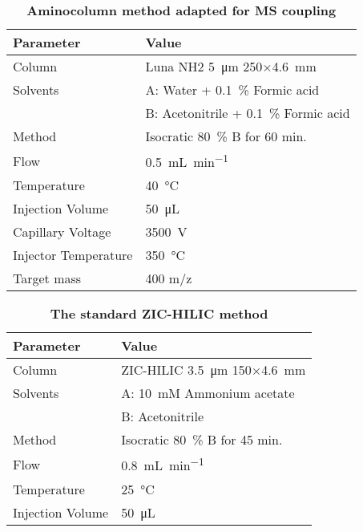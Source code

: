 	\begin{table}[htbp]
		\caption[Aminocolumn method adapted for MS coupling]{\textbf{Aminocolumn method adapted for MS coupling}}
		\label{tab:method_nh2_ms}
		\centering
		\begin{tabularx}{\textwidth}{XX}
			\toprule
			\textbf{Parameter}	& \textbf{Value}	\\
			\midrule
			Column 		& Luna NH2 \SI{5}{\micro\meter} 250$\times$\SI{4.6}{\milli\meter} 	\\
			Solvents	& A: Water + 0.1~\% Formic acid 	\\
						& B: Acetonitrile + 0.1~\% Formic acid		\\
			Method 		& Isocratic 80~\% B for 60 min. 	\\
			Flow 		& \SI{0.5}{\milli\liter\per\minute} \\
			Temperature & \SI{40}{\celsius} 	\\
			Injection Volume 	& \SI{50}{\micro\liter} 	\\
			\midrule
			Capillary Voltage 		& \SI{3500}{\volt} 	\\
			Injector Temperature	& \SI{350}{\celsius}\\
			Target mass 			& 400 m/z 			\\
			\bottomrule
		\end{tabularx}
	\end{table}

	\begin{table}[htbp]
		\caption[The standard ZIC-HILIC method]{\textbf{The standard ZIC-HILIC method}}
		\label{tab:method_hilic_standard}
		\centering
		\begin{tabularx}{\textwidth}{XX}
			\toprule
			\textbf{Parameter}	& \textbf{Value}	\\
			\midrule
			Column 		& ZIC-HILIC \SI{3.5}{\micro\meter} 150$\times$\SI{4.6}{\milli\meter} 	\\
			Solvents	& A: 	10~mM Ammonium acetate 	\\
						& B: 	Acetonitrile 			\\
			Method 		& Isocratic 80~\% B for 45 min. 	\\
			Flow 		& \SI{0.8}{\milli\liter\per\minute} \\
			Temperature & \SI{25}{\celsius} 	\\
			Injection Volume 	& \SI{50}{\micro\liter} 	\\
			\bottomrule
		\end{tabularx}
	\end{table}

